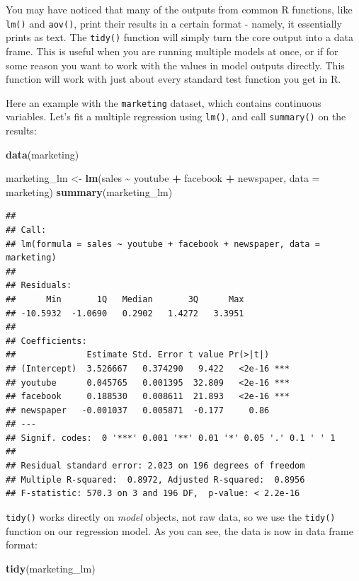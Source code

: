 \documentclass[
]{book}
\newenvironment{Shaded}{\begin{snugshade}}{\end{snugshade}}
\newcommand{\AttributeTok}[1]{\textcolor[rgb]{0.13,0.29,0.53}{#1}}
\newcommand{\FunctionTok}[1]{\textcolor[rgb]{0.13,0.29,0.53}{\textbf{#1}}}
\newcommand{\NormalTok}[1]{#1}
\newcommand{\OtherTok}[1]{\textcolor[rgb]{0.56,0.35,0.01}{#1}}
\newcommand{\SpecialCharTok}[1]{\textcolor[rgb]{0.81,0.36,0.00}{\textbf{#1}}}
\begin{document}
You may have noticed that many of the outputs from common R functions, like \texttt{lm()} and \texttt{aov()}, print their results in a certain format - namely, it essentially prints as text. The \texttt{tidy()} function will simply turn the core output into a data frame. This is useful when you are running multiple models at once, or if for some reason you want to work with the values in model outputs directly. This function will work with just about every standard test function you get in R.

Here an example with the \texttt{marketing} dataset, which contains continuous variables. Let's fit a multiple regression using \texttt{lm()}, and call \texttt{summary()} on the results:

\begin{Shaded}
\begin{Highlighting}[]
\FunctionTok{data}\NormalTok{(marketing)}

\NormalTok{marketing\_lm }\OtherTok{\textless{}{-}} \FunctionTok{lm}\NormalTok{(sales }\SpecialCharTok{\textasciitilde{}}\NormalTok{ youtube }\SpecialCharTok{+}\NormalTok{ facebook }\SpecialCharTok{+}\NormalTok{ newspaper, }\AttributeTok{data =}\NormalTok{ marketing)}
\FunctionTok{summary}\NormalTok{(marketing\_lm)}
\end{Highlighting}
\end{Shaded}

\begin{verbatim}
## 
## Call:
## lm(formula = sales ~ youtube + facebook + newspaper, data = marketing)
## 
## Residuals:
##      Min       1Q   Median       3Q      Max 
## -10.5932  -1.0690   0.2902   1.4272   3.3951 
## 
## Coefficients:
##              Estimate Std. Error t value Pr(>|t|)    
## (Intercept)  3.526667   0.374290   9.422   <2e-16 ***
## youtube      0.045765   0.001395  32.809   <2e-16 ***
## facebook     0.188530   0.008611  21.893   <2e-16 ***
## newspaper   -0.001037   0.005871  -0.177     0.86    
## ---
## Signif. codes:  0 '***' 0.001 '**' 0.01 '*' 0.05 '.' 0.1 ' ' 1
## 
## Residual standard error: 2.023 on 196 degrees of freedom
## Multiple R-squared:  0.8972, Adjusted R-squared:  0.8956 
## F-statistic: 570.3 on 3 and 196 DF,  p-value: < 2.2e-16
\end{verbatim}

\texttt{tidy()} works directly on \emph{model} objects, not raw data, so we use the \texttt{tidy()} function on our regression model. As you can see, the data is now in data frame format:

\begin{Shaded}
\begin{Highlighting}[]
\FunctionTok{tidy}\NormalTok{(marketing\_lm)}
\end{Highlighting}
\end{Shaded}
\end{document}
